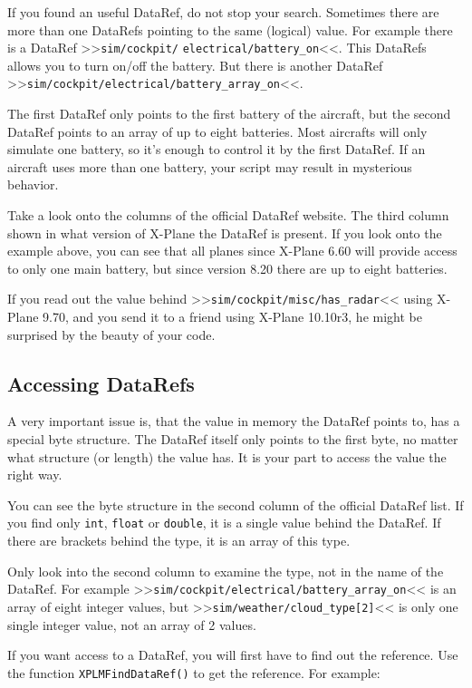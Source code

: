 \documentclass[11pt,parskip=half,a4paper]{scrartcl}
\begin{document}
If you found an useful DataRef, do not stop your search. Sometimes there are more than one DataRefs pointing to the same (logical) value. For example there is a DataRef >>\verb|sim/cockpit/| \verb|electrical/battery_on|<<. This DataRefs allows you to turn on/off the battery. But there is another DataRef >>\verb|sim/cockpit/electrical/battery_array_on|<<.

The first DataRef only points to the first battery of the aircraft, but the second DataRef points to an array of up to eight batteries. Most aircrafts will only simulate one battery, so it's enough to control it by the first DataRef. If an aircraft uses more than one battery, your script may result in mysterious behavior.

Take a look onto the columns of the official DataRef website. The third column shown in what version of X-Plane the DataRef is present. If you look onto the example above, you can see that all planes since X-Plane 6.60 will provide access to only one main battery, but since version 8.20 there are up to eight batteries.

If you read out the value behind >>\verb|sim/cockpit/misc/has_radar|<< using X-Plane 9.70, and you send it to a friend using X-Plane 10.10r3, he might be surprised by the beauty of your code.

\subsection{Accessing DataRefs}

A very important issue is, that the value in memory the DataRef points to, has a special byte structure. The DataRef itself only points to the first byte, no matter what structure (or length) the value has. It is your part to access the value the right way.

You can see the byte structure in the second column of the official DataRef list. If you find only \verb|int|, \verb|float| or \verb|double|, it is a single value behind the DataRef. If there are brackets behind the type, it is an array of this type.

Only look into the second column to examine the type, not in the name of the DataRef. For example >>\verb|sim/cockpit/electrical/battery_array_on|<< is an array of eight integer values, but >>\verb|sim/weather/cloud_type[2]|<< is only one single integer value, not an array of 2 values.

If you want access to a DataRef, you will first have to find out the reference. Use the function \verb|XPLMFindDataRef()| to get the reference. For example:
\end{document}
